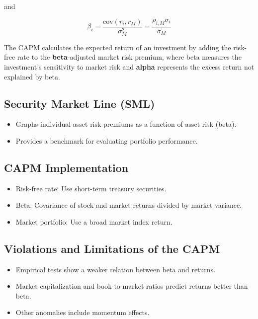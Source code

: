 \documentclass[
]{book}
\providecommand{\tightlist}{%
  \setlength{\itemsep}{0pt}\setlength{\parskip}{0pt}}
\begin{document}
and

\[
\beta_i = \frac{\text{cov}(r_i, r_M)}{\sigma_M^2} = \frac{\rho_{i,M} \sigma_i}{\sigma_M}
\]

The CAPM calculates the expected return of an investment by adding the risk-free rate to the \textbf{beta}-adjusted market risk premium, where beta measures the investment's sensitivity to market risk and \textbf{alpha} represents the excess return not explained by beta.

\hypertarget{security-market-line-sml}{%
\subsection{Security Market Line (SML)}\label{security-market-line-sml}}

\begin{itemize}
\tightlist
\item
  Graphs individual asset risk premiums as a function of asset risk (beta).
\item
  Provides a benchmark for evaluating portfolio performance.
\end{itemize}

\hypertarget{capm-implementation}{%
\subsection{CAPM Implementation}\label{capm-implementation}}

\begin{itemize}
\tightlist
\item
  Risk-free rate: Use short-term treasury securities.
\item
  Beta: Covariance of stock and market returns divided by market variance.
\item
  Market portfolio: Use a broad market index return.
\end{itemize}

\hypertarget{violations-and-limitations-of-the-capm}{%
\subsection{Violations and Limitations of the CAPM}\label{violations-and-limitations-of-the-capm}}

\begin{itemize}
\tightlist
\item
  Empirical tests show a weaker relation between beta and returns.
\item
  Market capitalization and book-to-market ratios predict returns better than beta.
\item
  Other anomalies include momentum effects.
\end{itemize}
\end{document}
